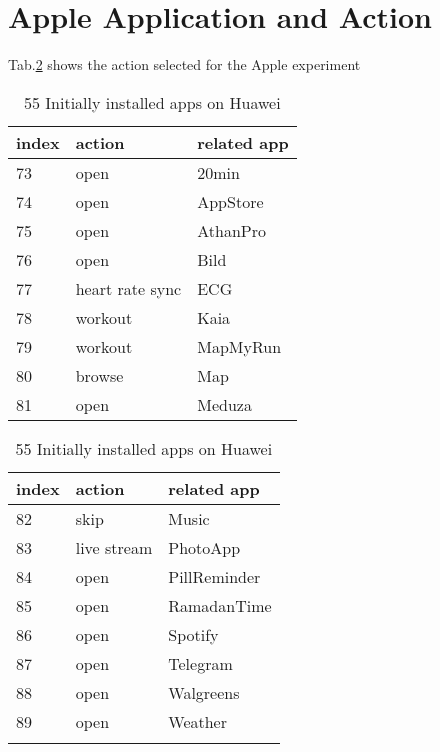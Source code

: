 \section{Apple Application and Action}

Tab.\ref{tab:apple_actions} shows the action selected for the Apple experiment
\begin{table}[ht]
\centering
\caption{55 Initially installed apps on Huawei}
    \label{tab:apple_actions}
    \begin{multicols}{2}
 \begin{tabular}{lll} 
 \toprule
 index & action & related app  \\ [0.5ex] 
 \midrule
 73 & open & 20min \\ 

 74 & open &  AppStore  \\

 75  & open & AthanPro    \\
 
 76 & open & Bild    \\
 
 77 & heart rate sync & ECG    \\
 
 78  & workout & Kaia   \\
 
 79  & workout & MapMyRun   \\
 
 80  & browse & Map  \\
 
 81  & open & Meduza   \\
 
 
 \bottomrule
\end{tabular}\columnbreak
\begin{center}
\begin{tabular}{lll} 
 \toprule
 index & action & related app  \\ [0.5ex] 
 \midrule
 
 82 & skip & Music \\ 

 83 & live stream & PhotoApp  \\

 84  & open & PillReminder     \\
 
 85 & open & RamadanTime    \\
 
 86 & open & Spotify    \\
 
 87  & open & Telegram   \\
 
 88  & open & Walgreens   \\
 
 89  & open & Weather   \\

 \\
 \bottomrule
\end{tabular}
\end{center}
\end{multicols}
\end{table}

